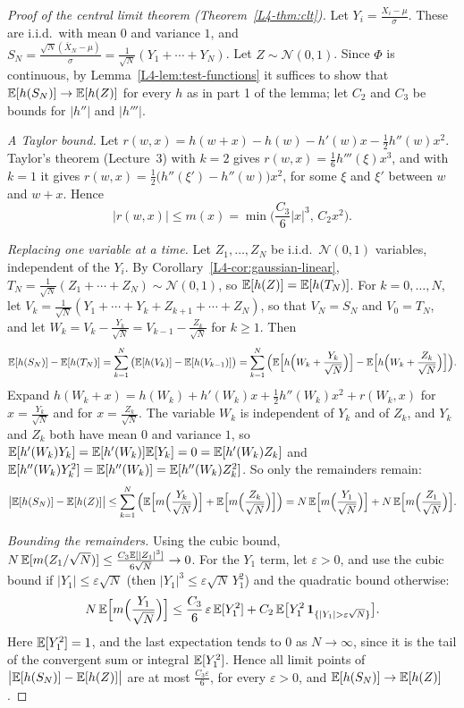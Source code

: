 \begin{proof}[Proof of the central limit theorem (Theorem~\ref{L4-thm:clt})]
    Let $Y_i = \frac{X_i - \mu}{\sigma}$. These are i.i.d.\ with mean $0$ and variance $1$, and $S_N = \frac{\sqrt{N}(\bar X_N - \mu)}{\sigma} = \frac{1}{\sqrt{N}}(Y_1 + \cdots + Y_N)$. Let $Z \sim \mathcal{N}(0, 1)$. Since $\Phi$ is continuous, by Lemma~\ref{L4-lem:test-functions} it suffices to show that $\mathbb{E}[h(S_N)] \to \mathbb{E}[h(Z)]$ for every $h$ as in part 1 of the lemma; let $C_2$ and $C_3$ be bounds for $|h''|$ and $|h'''|$.

    \emph{A Taylor bound.} Let $r(w, x) = h(w + x) - h(w) - h'(w)x - \frac{1}{2}h''(w)x^2$. Taylor's theorem (Lecture~3) with $k = 2$ gives $r(w, x) = \frac{1}{6}h'''(\xi)x^3$, and with $k = 1$ it gives $r(w, x) = \frac{1}{2}\big(h''(\xi') - h''(w)\big)x^2$, for some $\xi$ and $\xi'$ between $w$ and $w + x$. Hence
    \[|r(w, x)| \leq m(x) = \min\Big(\frac{C_3}{6}|x|^3, \, C_2x^2\Big).\]

    \emph{Replacing one variable at a time.} Let $Z_1, \ldots, Z_N$ be i.i.d.\ $\mathcal{N}(0, 1)$ variables, independent of the $Y_i$. By Corollary~\ref{L4-cor:gaussian-linear}, $T_N = \frac{1}{\sqrt{N}}(Z_1 + \cdots + Z_N) \sim \mathcal{N}(0, 1)$, so $\mathbb{E}[h(Z)] = \mathbb{E}[h(T_N)]$. For $k = 0, \ldots, N$, let $V_k = \frac{1}{\sqrt{N}}(Y_1 + \cdots + Y_k + Z_{k+1} + \cdots + Z_N)$, so that $V_N = S_N$ and $V_0 = T_N$, and let $W_k = V_k - \frac{Y_k}{\sqrt{N}} = V_{k-1} - \frac{Z_k}{\sqrt{N}}$ for $k \geq 1$. Then
    \[\mathbb{E}[h(S_N)] - \mathbb{E}[h(T_N)] = \sum_{k=1}^N \big(\mathbb{E}[h(V_k)] - \mathbb{E}[h(V_{k-1})]\big) = \sum_{k=1}^N \Big(\mathbb{E}\Big[h\Big(W_k + \frac{Y_k}{\sqrt{N}}\Big)\Big] - \mathbb{E}\Big[h\Big(W_k + \frac{Z_k}{\sqrt{N}}\Big)\Big]\Big).\]
    Expand $h(W_k + x) = h(W_k) + h'(W_k)x + \frac{1}{2}h''(W_k)x^2 + r(W_k, x)$ for $x = \frac{Y_k}{\sqrt{N}}$ and for $x = \frac{Z_k}{\sqrt{N}}$. The variable $W_k$ is independent of $Y_k$ and of $Z_k$, and $Y_k$ and $Z_k$ both have mean $0$ and variance $1$, so $\mathbb{E}[h'(W_k)Y_k] = \mathbb{E}[h'(W_k)]\mathbb{E}[Y_k] = 0 = \mathbb{E}[h'(W_k)Z_k]$ and $\mathbb{E}[h''(W_k)Y_k^2] = \mathbb{E}[h''(W_k)] = \mathbb{E}[h''(W_k)Z_k^2]$. So only the remainders remain:
    \[\big|\mathbb{E}[h(S_N)] - \mathbb{E}[h(Z)]\big| \leq \sum_{k=1}^N \Big(\mathbb{E}\Big[m\Big(\frac{Y_k}{\sqrt{N}}\Big)\Big] + \mathbb{E}\Big[m\Big(\frac{Z_k}{\sqrt{N}}\Big)\Big]\Big) = N\,\mathbb{E}\Big[m\Big(\frac{Y_1}{\sqrt{N}}\Big)\Big] + N\,\mathbb{E}\Big[m\Big(\frac{Z_1}{\sqrt{N}}\Big)\Big].\]

    \emph{Bounding the remainders.} Using the cubic bound, $N\,\mathbb{E}[m(Z_1/\sqrt{N})] \leq \frac{C_3\mathbb{E}[|Z_1|^3]}{6\sqrt{N}} \to 0$. For the $Y_1$ term, let $\varepsilon > 0$, and use the cubic bound if $|Y_1| \leq \varepsilon\sqrt{N}$ (then $|Y_1|^3 \leq \varepsilon\sqrt{N}\,Y_1^2$) and the quadratic bound otherwise:
    \[N\,\mathbb{E}\Big[m\Big(\frac{Y_1}{\sqrt{N}}\Big)\Big] \leq \frac{C_3}{6}\,\varepsilon\,\mathbb{E}[Y_1^2] + C_2\,\mathbb{E}\big[Y_1^2\,\mathbf{1}_{\{|Y_1| > \varepsilon\sqrt{N}\}}\big].\]
    Here $\mathbb{E}[Y_1^2] = 1$, and the last expectation tends to $0$ as $N \to \infty$, since it is the tail of the convergent sum or integral $\mathbb{E}[Y_1^2]$. Hence all limit points of $\big|\mathbb{E}[h(S_N)] - \mathbb{E}[h(Z)]\big|$ are at most $\frac{C_3\varepsilon}{6}$, for every $\varepsilon > 0$, and $\mathbb{E}[h(S_N)] \to \mathbb{E}[h(Z)]$.
\end{proof}

